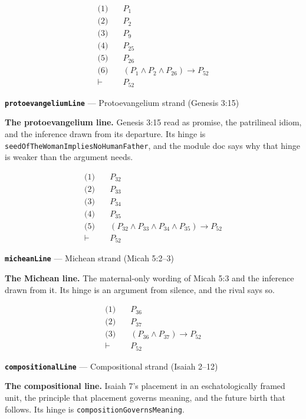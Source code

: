 \documentclass[11pt]{article}
\begin{document}
\begin{align*}
  \text{(1)} \quad & P_{1} \\
  \text{(2)} \quad & P_{2} \\
  \text{(3)} \quad & P_{9} \\
  \text{(4)} \quad & P_{25} \\
  \text{(5)} \quad & P_{26} \\
  \text{(6)} \quad & (P_{1} \land P_{2} \land P_{26}) \rightarrow P_{52} \\
  \vdash \quad & P_{52}
\end{align*}
\par\medskip\noindent\textbf{\texttt{protoevangelium\allowbreak{}Line}} --- Protoevangelium strand (Genesis 3:15)\par\nobreak\noindent
\textbf{The protoevangelium line.} Genesis 3:15 read as promise, the patrilineal idiom, and the inference drawn from its departure. Its hinge is \texttt{seed\allowbreak{}Of\allowbreak{}The\allowbreak{}Woman\allowbreak{}Implies\allowbreak{}No\allowbreak{}Human\allowbreak{}Father}, and the module doc says why that hinge is weaker than the argument needs.

\begin{align*}
  \text{(1)} \quad & P_{32} \\
  \text{(2)} \quad & P_{33} \\
  \text{(3)} \quad & P_{34} \\
  \text{(4)} \quad & P_{35} \\
  \text{(5)} \quad & (P_{32} \land P_{33} \land P_{34} \land P_{35}) \rightarrow P_{52} \\
  \vdash \quad & P_{52}
\end{align*}
\par\medskip\noindent\textbf{\texttt{michean\allowbreak{}Line}} --- Michean strand (Micah 5:2–3)\par\nobreak\noindent
\textbf{The Michean line.} The maternal-only wording of Micah 5:3 and the inference drawn from it. Its hinge is an argument from silence, and the rival says so.

\begin{align*}
  \text{(1)} \quad & P_{36} \\
  \text{(2)} \quad & P_{37} \\
  \text{(3)} \quad & (P_{36} \land P_{37}) \rightarrow P_{52} \\
  \vdash \quad & P_{52}
\end{align*}
\par\medskip\noindent\textbf{\texttt{compositional\allowbreak{}Line}} --- Compositional strand (Isaiah 2–12)\par\nobreak\noindent
\textbf{The compositional line.} Isaiah 7's placement in an eschatologically framed unit, the principle that placement governs meaning, and the future birth that follows. Its hinge is \texttt{composition\allowbreak{}Governs\allowbreak{}Meaning}.
\end{document}
